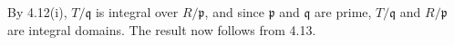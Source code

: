 By 4.12(i), $T/\mathfrak{q}$ is integral over $R/\mathfrak{p}$, and since $\mathfrak{p}$
and $\mathfrak{q}$ are prime, $T/\mathfrak{q}$ and $R/\mathfrak{p}$ are integral
domains. The result now follows from 4.13.
